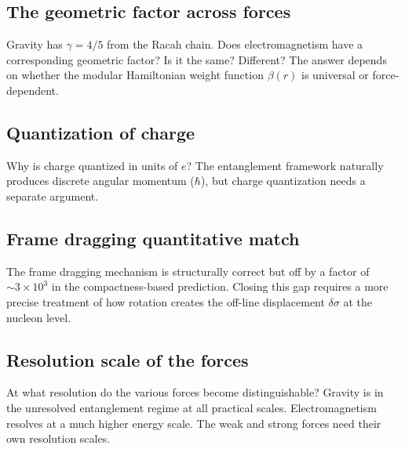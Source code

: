 \documentclass[11pt,letterpaper]{article}
\begin{document}
\subsection{The geometric factor across forces}

Gravity has $\gamma = 4/5$ from the Racah chain. Does electromagnetism have
a corresponding geometric factor? Is it the same? Different? The answer
depends on whether the modular Hamiltonian weight function $\beta(r)$ is
universal or force-dependent.

\subsection{Quantization of charge}

Why is charge quantized in units of $e$? The entanglement framework naturally
produces discrete angular momentum ($\hbar$), but charge quantization needs
a separate argument.

\subsection{Frame dragging quantitative match}

The frame dragging mechanism is structurally correct but off by a factor of
$\sim 3 \times 10^3$ in the compactness-based prediction. Closing this gap
requires a more precise treatment of how rotation creates the off-line
displacement $\delta\sigma$ at the nucleon level.

\subsection{Resolution scale of the forces}

At what resolution do the various forces become distinguishable?
Gravity is in the unresolved entanglement regime at all practical scales.
Electromagnetism resolves at a much higher energy scale. The weak and strong
forces need their own resolution scales.



\end{document}
